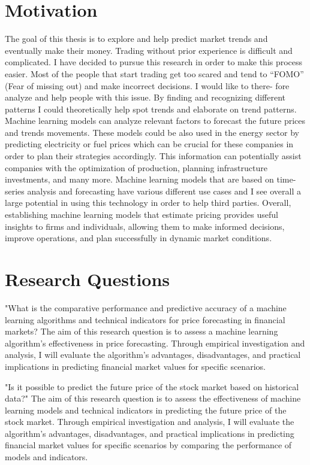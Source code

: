 \documentclass{imc-inf}
\begin{document}
	\section{Motivation}
	The goal of this thesis is to explore and help predict market trends and
	eventually make their money. Trading without prior experience is difficult
	and complicated. I have decided to pursue this research in order to make this
	process easier. Most of the people that start trading get too scared and tend to
	“FOMO” (Fear of missing out) and make incorrect decisions. I would like to there-
	fore analyze and help people with this issue. By finding and recognizing different
	patterns I could theoretically help spot trends and elaborate on trend patterns.
	Machine learning models can analyze relevant factors to forecast the future prices and trends movements.
	These models could be also used in the energy sector by predicting electricity or
	fuel prices which can be crucial for these companies in order to plan their strategies accordingly. This information can potentially assist companies with the optimization of production,
	planning infrastructure investments, and many more. Machine learning models that
	are based on time-series analysis and forecasting have various different use cases
	and I see overall a large potential in using this technology in order to help third parties. Overall, establishing machine learning models that estimate pricing provides
	useful insights to firms and individuals, allowing them to make informed decisions,
	improve operations, and plan successfully in dynamic market conditions.
	
	\section{Research Questions} 
	
	"What is the comparative performance and predictive accuracy of a machine learning
	algorithms and technical indicators for price forecasting in financial markets? The aim of this research
	question is to assess a machine learning algorithm's effectiveness in price forecasting.
	Through empirical investigation and analysis, I will evaluate the algorithm's advantages,
	disadvantages, and practical implications in predicting financial market values for specific scenarios.
	
	
	"Is it possible to predict the future price of the stock market based on historical data?" 
	The aim of this research question is to assess the effectiveness of machine learning models 
	and technical indicators in predicting the future price of the stock market.
	Through empirical investigation and analysis, I will evaluate the algorithm's advantages,
	disadvantages, and practical implications in predicting financial market values for specific scenarios by comparing the performance of models and indicators.
	
\end{document}
